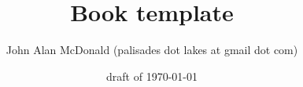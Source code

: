 \documentclass{PalisadesLakesBook}
\title{Book template}
\author{John Alan McDonald 
(palisades dot lakes at gmail dot com)}
\date{draft of \today}
\begin{document}
\maketitle
\PalisadesLakesTableOfContents

\end{document}
